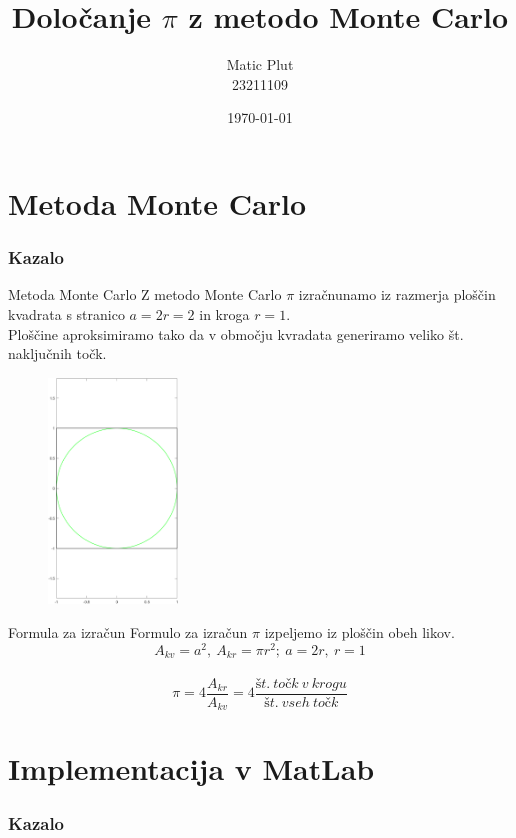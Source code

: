 \documentclass{beamer}
\title{Določanje $\pi$ z metodo Monte Carlo}
\author[Matic Plut]{Matic Plut \\ 23211109}
\date{\today}
\begin{document}
\begin{frame}
    \titlepage
\end{frame}
\logo{}

\section{Metoda Monte Carlo}

\begin{frame}
    \frametitle{Kazalo}
    \tableofcontents[currentsection]
\end{frame}

\begin{frame}{Metoda Monte Carlo}
    Z metodo Monte Carlo $\pi$ izračnunamo iz razmerja ploščin kvadrata s stranico $a = 2r = 2$ in kroga $r = 1$.
    \\
    Ploščine aproksimiramo tako da v območju kvradata generiramo veliko št. naključnih točk.

    \begin{figure}
      \centering
      \includegraphics[height=6cm]{graf.png}
    \end{figure}
\end{frame}

\begin{frame}{Formula za izračun}
    Formulo za izračun $\pi$ izpeljemo iz ploščin obeh likov.\\
    \pause
    $$A_{kv}=a^2,~A_{kr}=\pi r^2;~a=2r,~r=1$$\\
    \pause
    $$\pi = 4\frac{A_{kr}}{A_{kv}}=4\frac{št.~točk~v~krogu}{št.~vseh~točk}$$
\end{frame}

\section{Implementacija v MatLab}

\begin{frame}
    \frametitle{Kazalo}
    \tableofcontents[currentsection]
\end{frame}
\end{document}
